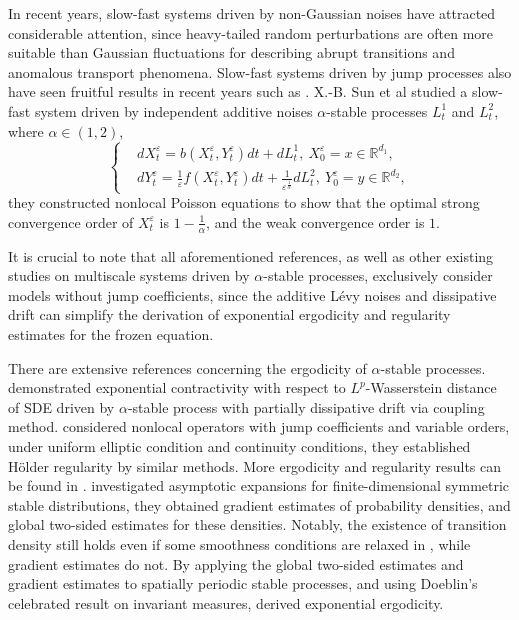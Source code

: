 \documentclass[11pt,reqno]{amsart}
\numberwithin{equation}{section}
\newcommand{\al}{\alpha}
\begin{document}
In recent years, slow-fast systems driven by non-Gaussian noises have attracted considerable attention, since heavy-tailed random perturbations are often more suitable than Gaussian fluctuations for describing abrupt transitions and anomalous transport phenomena.  Slow-fast systems driven by jump processes also have seen fruitful results in recent years such as \cite{CSS,YXJ,ZHWWD}. X.-B. Sun et al \cite{SXX} studied a slow-fast system driven by independent additive noises $\alpha$-stable processes $L^{1}_{t}$ and $L^{2}_{t}$, where $\alpha\in(1,2)$,
\begin{equation}\label{3}
	\left\{
	\begin{aligned}
			& dX_{t}^{\varepsilon}=b(X_{t}^{\varepsilon},Y_{t}^{\varepsilon})dt+dL^{1}_{t},\ X^{\varepsilon}_{0}=x\in \mathbb{R}^{d_{1} },\\	&dY_{t}^{\varepsilon}=\frac{1}{\varepsilon}f(X_{t}^{\varepsilon},Y_{t}^{\varepsilon})dt+\frac{1}{\varepsilon^{\frac{1}{\alpha}}}dL^{2}_{t},\ Y^{\varepsilon}_{0}=y\in \mathbb{R}^{d_{2}},
			\end{aligned}	
			\right.
			\end{equation}
 they constructed nonlocal Poisson equations to show that the optimal strong convergence order of $X^{\varepsilon}_{t}$ is $1-\frac{1}{\alpha}$, and the weak convergence order is $1$. 
 
‌It is crucial to note‌ that all aforementioned references, as well as other existing studies on multiscale systems driven by $\alpha$-stable processes, exclusively consider models without jump coefficients, since the additive Lévy noises and dissipative drift can simplify the derivation of exponential ergodicity and regularity estimates for the frozen equation.

There are extensive references concerning the ergodicity of $\al$-stable processes. \cite{JW2} demonstrated exponential contractivity with respect to $L^p$-Wasserstein distance of SDE driven by $\al$-stable process with partially dissipative drift via coupling method.  \cite{DW} considered nonlocal operators with jump coefficients and variable orders, under uniform elliptic condition and continuity conditions, they established Hölder regularity by similar methods.  More ergodicity and regularity results can be found in \cite{BSWX, LW, MBM}.
\cite{VK} investigated asymptotic expansions for finite-dimensional symmetric stable distributions, %
they obtained gradient estimates of probability densities, %
and global two-sided estimates for these densities. Notably, the existence of transition density still holds even if some smoothness conditions are relaxed in \cite{ANK}, while gradient estimates do not. By applying the global two-sided estimates and gradient estimates to spatially periodic stable processes, and using Doeblin's celebrated result on invariant measures, \cite{BF} derived exponential ergodicity. 
\end{document}
